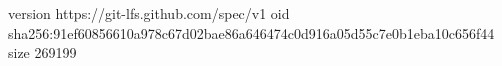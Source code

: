version https://git-lfs.github.com/spec/v1
oid sha256:91ef60856610a978c67d02bae86a646474c0d916a05d55c7e0b1eba10c656f44
size 269199
